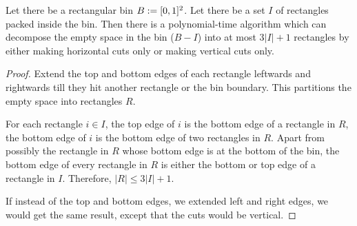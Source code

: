 \begin{lemma}
\label{lem:empty-to-rects}
Let there be a rectangular bin $B := [0, 1]^2$.
Let there be a set $I$ of rectangles packed inside the bin.
Then there is a polynomial-time algorithm which can decompose the empty space in the bin
($B - I$) into at most $3|I|+1$ rectangles by either making horizontal cuts only
or making vertical cuts only.
\end{lemma}
\begin{proof}
Extend the top and bottom edges of each rectangle leftwards and rightwards
till they hit another rectangle or the bin boundary.
This partitions the empty space into rectangles $R$.

For each rectangle $i \in I$, the top edge of $i$ is the bottom edge of a rectangle in $R$,
the bottom edge of $i$ is the bottom edge of two rectangles in $R$.
Apart from possibly the rectangle in $R$ whose bottom edge is at the bottom of the bin,
the bottom edge of every rectangle in $R$ is either the bottom or top edge of a rectangle in $I$.
Therefore, $|R| \le 3|I| + 1$.

If instead of the top and bottom edges, we extended left and right edges,
we would get the same result, except that the cuts would be vertical.
\end{proof}

